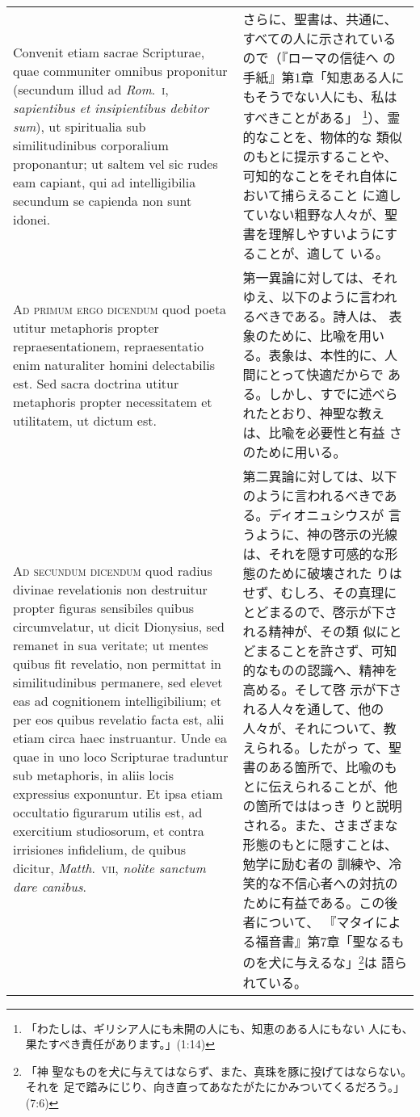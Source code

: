 \documentclass[10pt]{jsarticle}
\begin{document}
\begin{longtable}{p{21em}p{21em}}
Convenit etiam sacrae Scripturae, quae communiter omnibus proponitur
(secundum illud ad {\itshape Rom}.~{\scshape i}, {\itshape sapientibus
et insipientibus debitor sum}), ut spiritualia sub similitudinibus
corporalium proponantur; ut saltem vel sic rudes eam capiant, qui ad
intelligibilia secundum se capienda non sunt idonei.


&


さらに、聖書は、共通に、すべての人に示されているので（『ローマの信徒へ
の手紙』第1章「知恵ある人にもそうでない人にも、私はすべきことがある」
\footnote{「わたしは、ギリシア人にも未開の人にも、知恵のある人にもない
人にも、果たすべき責任があります。」(1:14)}）、霊的なことを、物体的な
類似のもとに提示することや、可知的なことをそれ自体において捕らえること
に適していない粗野な人々が、聖書を理解しやすいようにすることが、適して
いる。


\\


{\scshape Ad primum ergo dicendum} quod poeta utitur metaphoris
propter repraesentationem, repraesentatio enim naturaliter homini
delectabilis est. Sed sacra doctrina utitur metaphoris propter
necessitatem et utilitatem, ut dictum est.


&

第一異論に対しては、それゆえ、以下のように言われるべきである。詩人は、
表象のために、比喩を用いる。表象は、本性的に、人間にとって快適だからで
ある。しかし、すでに述べられたとおり、神聖な教えは、比喩を必要性と有益
さのために用いる。


\\


{\scshape Ad secundum dicendum} quod radius divinae revelationis non
destruitur propter figuras sensibiles quibus circumvelatur, ut dicit
Dionysius, sed remanet in sua veritate; ut mentes quibus fit
revelatio, non permittat in similitudinibus permanere, sed elevet eas
ad cognitionem intelligibilium; et per eos quibus revelatio facta est,
alii etiam circa haec instruantur. Unde ea quae in uno loco Scripturae
traduntur sub metaphoris, in aliis locis expressius exponuntur. Et
ipsa etiam occultatio figurarum utilis est, ad exercitium studiosorum,
et contra irrisiones infidelium, de quibus dicitur, {\itshape
Matth}.~{\scshape vii}, {\itshape nolite sanctum dare canibus}.


&

第二異論に対しては、以下のように言われるべきである。ディオニュシウスが
言うように、神の啓示の光線は、それを隠す可感的な形態のために破壊された
りはせず、むしろ、その真理にとどまるので、啓示が下される精神が、その類
似にとどまることを許さず、可知的なものの認識へ、精神を高める。そして啓
示が下される人々を通して、他の人々が、それについて、教えられる。したがっ
て、聖書のある箇所で、比喩のもとに伝えられることが、他の箇所でははっき
りと説明される。また、さまざまな形態のもとに隠すことは、勉学に励む者の
訓練や、冷笑的な不信心者への対抗のために有益である。この後者について、
『マタイによる福音書』第7章「聖なるものを犬に与えるな」\footnote{「神
聖なものを犬に与えてはならず、また、真珠を豚に投げてはならない。それを
足で踏みにじり、向き直ってあなたがたにかみついてくるだろう。」(7:6)}は
語られている。


\end{longtable}
\end{document}
